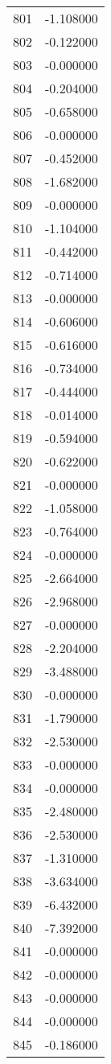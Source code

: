 \documentclass[12pt]{article}
\begin{document}
\begin{longtable}{@{}cc@{}}
801 & -1.108000 \\
802 & -0.122000 \\
803 & -0.000000 \\
804 & -0.204000 \\
805 & -0.658000 \\
806 & -0.000000 \\
807 & -0.452000 \\
808 & -1.682000 \\
809 & -0.000000 \\
810 & -1.104000 \\
811 & -0.442000 \\
812 & -0.714000 \\
813 & -0.000000 \\
814 & -0.606000 \\
815 & -0.616000 \\
816 & -0.734000 \\
817 & -0.444000 \\
818 & -0.014000 \\
819 & -0.594000 \\
820 & -0.622000 \\
821 & -0.000000 \\
822 & -1.058000 \\
823 & -0.764000 \\
824 & -0.000000 \\
825 & -2.664000 \\
826 & -2.968000 \\
827 & -0.000000 \\
828 & -2.204000 \\
829 & -3.488000 \\
830 & -0.000000 \\
831 & -1.790000 \\
832 & -2.530000 \\
833 & -0.000000 \\
834 & -0.000000 \\
835 & -2.480000 \\
836 & -2.530000 \\
837 & -1.310000 \\
838 & -3.634000 \\
839 & -6.432000 \\
840 & -7.392000 \\
841 & -0.000000 \\
842 & -0.000000 \\
843 & -0.000000 \\
844 & -0.000000 \\
845 & -0.186000 \\

\end{longtable}
\end{document}
